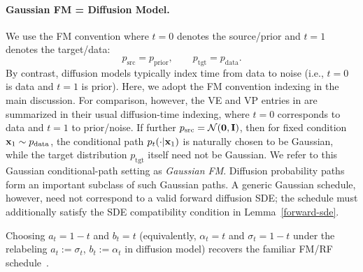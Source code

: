 \paragraph{Gaussian FM = Diffusion Model.}
We use the FM convention where $t=0$ denotes the source/prior and $t=1$ denotes the target/data:
\[
p_{\mathrm{src}}=p_{\mathrm{prior}},\qquad p_{\mathrm{tgt}}=p_{\mathrm{data}}.
\]
By contrast, diffusion models typically index time from data to noise (i.e., $t=0$ is data and $t=1$ is prior). 
Here, we adopt the FM convention indexing in the main discussion. For comparison, however, the VE and VP entries in  are summarized in their usual diffusion-time indexing, where $t=0$ corresponds to data and $t=1$ to prior/noise.
If further $p_{\mathrm{src}}=\mathcal N(\bm 0,{\mathbf{I}})$, then for fixed condition ${\mathbf{x}}_1\sim p_{\mathrm{data}}$, 
the conditional path $p_t(\cdot |{\mathbf{x}}_1)$ is naturally chosen to be Gaussian, 
while the target distribution $p_{\mathrm{tgt}}$ itself need not be Gaussian. We refer to this Gaussian conditional-path setting as \emph{Gaussian FM}.
Diffusion probability paths form an important subclass of such Gaussian
paths. A generic Gaussian schedule, however, need not correspond to a valid
forward diffusion SDE; the schedule must additionally satisfy the SDE
compatibility condition in Lemma~\ref{forward-sde}.



Choosing $a_t = 1-t$ and $b_t = t$ (equivalently, $\alpha_t = t$ and $\sigma_t = 1-t$ under the relabeling $a_t:=\sigma_t$, $b_t:=\alpha_t$ in diffusion model) recovers the familiar FM/RF schedule~\citep{lipman2022flow,liu2022rectified}.


